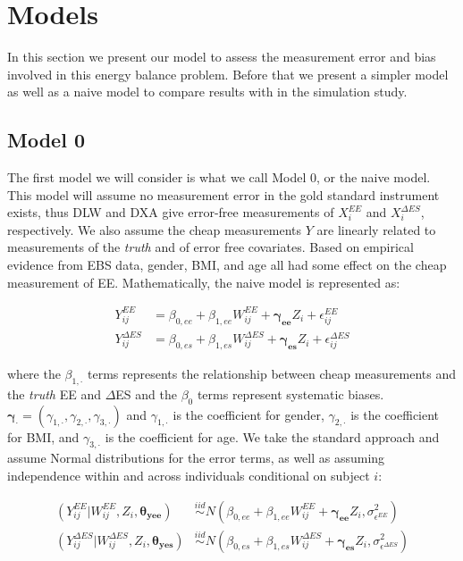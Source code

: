 \documentclass[11pt]{article}\usepackage[]{graphicx}\usepackage[]{color}
\begin{document}
\section{Models}

In this section we present our model to assess the measurement error and bias involved in this energy balance problem. Before that we present a simpler  model as well as a naive model to compare results with in the simulation study.

\subsection{Model 0}

The first model we will consider is what we call Model 0, or the naive model. This model will assume no measurement error in the gold standard instrument exists,  thus DLW and DXA give error-free measurements of $X_i^{EE}$ and $X_i^{\Delta ES}$, respectively. We also assume the cheap measurements $Y$ are linearly related to measurements of the \emph{truth} and of error free covariates. Based on empirical evidence from EBS data, gender, BMI, and age all had some effect on the cheap measurement of EE.  Mathematically, the naive model is represented as:

\begin{align}
Y_{ij}^{EE} &= \beta_{0,ee} + \beta_{1,ee}W_{ij}^{EE}+ \boldsymbol{\gamma_{ee}}Z_i + \epsilon_{ij}^{EE} \\
Y_{ij}^{\Delta ES} &= \beta_{0,es} + \beta_{1,es}W_{ij}^{\Delta ES}+ \boldsymbol{\gamma_{es}}Z_i + \epsilon_{ij}^{\Delta ES} 
\end{align}

where the $\beta_{1,\cdot}$ terms represents the relationship between cheap measurements and the \emph{truth} EE and $\Delta$ES and the $\beta_0$ terms represent systematic biases. $\boldsymbol{\gamma_{\cdot}}=(\gamma_{1,\cdot},\gamma_{2,\cdot},\gamma_{3,\cdot})$ and $\gamma_{1,\cdot}$ is the coefficient for gender, $\gamma_{2,\cdot}$ is the coefficient for BMI, and $\gamma_{3,\cdot}$ is the coefficient for age. We take the standard approach and assume Normal distributions for the error terms, as well as assuming independence within and across individuals conditional on subject $i$:

\begin{align}
  \label{ymodel0}
  (Y_{ij}^{EE} | W_{ij}^{EE},Z_i,\boldsymbol{\theta_{yee}}) &\overset{iid}{\sim} N(\beta_{0,ee} + \beta_{1,ee}W_{ij}^{EE}+ \boldsymbol{\gamma_{ee}}Z_i,\sigma_{\epsilon^{EE}}^2) \\
  \label{ymodel0b}
  (Y_{ij}^{\Delta ES} | W_{ij}^{\Delta ES},Z_i,\boldsymbol{\theta_{yes}}) &\overset{iid}{\sim} N(\beta_{0,es} + \beta_{1,es}W_{ij}^{\Delta ES}+ \boldsymbol{\gamma_{es}}Z_i,\sigma_{\epsilon^{\Delta ES}}^2)
\end{align}
\end{document}
